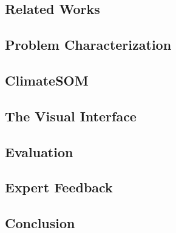\subsection{Related Works}\label{sec:relworks}

\subsection{Problem Characterization}\label{sec:problem}

\subsection{ClimateSOM}\label{sec:workflow}

\subsection{The Visual Interface}

\subsection{Evaluation}

\subsection{Expert Feedback}

% 
\subsection{Conclusion}



